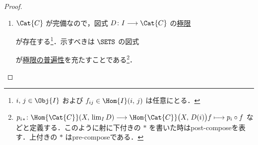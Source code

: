 \documentclass[TQFT_main]{subfiles}
\begin{document}
\begin{proof}
    \begin{enumerate}
        \item $\Cat{C}$ が完備なので，図式 $D \colon I \lto \Cat{C}$ の\hyperref[def:limit]{極限}
        \begin{center}
        \end{center}
        が存在する\footnote{$i,\, j \in \Obj{I}$ および $f_{ij} \in \Hom{I}(i,\, j)$ は任意にとる．}．示すべきは $\SETS$ の図式
        \begin{center}
        \end{center}
        が\hyperref[cmtd:lim]{極限の普遍性}を充たすことである\footnote{$p_i{}_* \colon \Hom{\Cat{C}}(X,\, \lim_I D) \lto \Hom{\Cat{C}} \bigl( X,\, D(i) \bigr)  f \lmto p_i \circ f$ などと定義する．このように射に下付きの $*$ を書いた時はpost-composeを表す．上付きの $*$ はpre-composeである．}．


\end{enumerate}
\end{proof}
\end{document}
